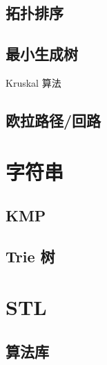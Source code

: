 \documentclass{article}
\begin{document}


\subsection{拓扑排序}



\subsection{最小生成树}

Kruskal 算法



\subsection{欧拉路径/回路}



\section{字符串}

\subsection{KMP}



\subsection{Trie 树}

\section{STL}

\subsection{算法库}


\end{document}
